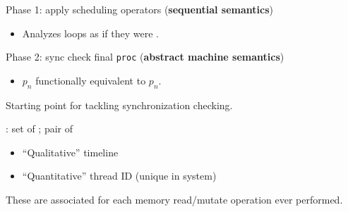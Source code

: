 \newpage
{}

{\LARGE
Phase 1: apply scheduling operators (\textbf{sequential semantics})
\begin{itemize}
  \item Analyzes  loops as if they were .
\end{itemize}

Phase 2: sync check final \texttt{proc} (\textbf{abstract machine semantics})
\begin{itemize}
  \item {} $p_n$ functionally equivalent to  $p_n$.
\end{itemize}
}

\begin{center}
{\large
{}
}
\end{center}


\newpage
{}

{\LARGE
Starting point for tackling synchronization checking.

\vspace{5mm}

: set of ; pair of
\begin{itemize}
  \item ``Qualitative'' timeline
  \item ``Quantitative'' thread ID (unique in system)
\end{itemize}

\vspace{5mm}

These are associated for each memory read/mutate operation ever performed.

}


\newpage
{}

